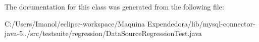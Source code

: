 The documentation for this class was generated from the following file\+:\begin{DoxyCompactItemize}
\item 
C\+:/\+Users/\+Imanol/eclipse-\/workspace/\+Maquina Expendedora/lib/mysql-\/connector-\/java-\/5../src/testsuite/regression/Data\+Source\+Regression\+Test.\+java\end{DoxyCompactItemize}

